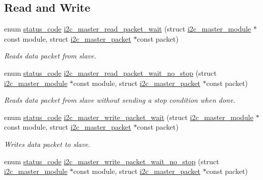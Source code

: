 \subsection*{Read and Write}
\begin{DoxyCompactItemize}
\item 
enum \mbox{\hyperlink{group__group__sam0__utils__status__codes_ga751c892e5a46b8e7d282085a5a5bf151}{status\+\_\+code}} \mbox{\hyperlink{group__asfdoc__sam0__sercom__i2c__group_ga238a755f972b9c3287131cda5fc25725}{i2c\+\_\+master\+\_\+read\+\_\+packet\+\_\+wait}} (struct \mbox{\hyperlink{structi2c__master__module}{i2c\+\_\+master\+\_\+module}} $\ast$const module, struct \mbox{\hyperlink{structi2c__master__packet}{i2c\+\_\+master\+\_\+packet}} $\ast$const packet)
\begin{DoxyCompactList}\small\item\em Reads data packet from slave. \end{DoxyCompactList}\item 
enum \mbox{\hyperlink{group__group__sam0__utils__status__codes_ga751c892e5a46b8e7d282085a5a5bf151}{status\+\_\+code}} \mbox{\hyperlink{group__asfdoc__sam0__sercom__i2c__group_gaa8b27eb9e3a8ae0f907bf7078d4001f0}{i2c\+\_\+master\+\_\+read\+\_\+packet\+\_\+wait\+\_\+no\+\_\+stop}} (struct \mbox{\hyperlink{structi2c__master__module}{i2c\+\_\+master\+\_\+module}} $\ast$const module, struct \mbox{\hyperlink{structi2c__master__packet}{i2c\+\_\+master\+\_\+packet}} $\ast$const packet)
\begin{DoxyCompactList}\small\item\em Reads data packet from slave without sending a stop condition when done. \end{DoxyCompactList}\item 
enum \mbox{\hyperlink{group__group__sam0__utils__status__codes_ga751c892e5a46b8e7d282085a5a5bf151}{status\+\_\+code}} \mbox{\hyperlink{group__asfdoc__sam0__sercom__i2c__group_ga6c07057fe2534e8b4a3ce2cfe2dafc1b}{i2c\+\_\+master\+\_\+write\+\_\+packet\+\_\+wait}} (struct \mbox{\hyperlink{structi2c__master__module}{i2c\+\_\+master\+\_\+module}} $\ast$const module, struct \mbox{\hyperlink{structi2c__master__packet}{i2c\+\_\+master\+\_\+packet}} $\ast$const packet)
\begin{DoxyCompactList}\small\item\em Writes data packet to slave. \end{DoxyCompactList}\item 
enum \mbox{\hyperlink{group__group__sam0__utils__status__codes_ga751c892e5a46b8e7d282085a5a5bf151}{status\+\_\+code}} \mbox{\hyperlink{group__asfdoc__sam0__sercom__i2c__group_ga4d874599c2bff10cd08f5474041c66bb}{i2c\+\_\+master\+\_\+write\+\_\+packet\+\_\+wait\+\_\+no\+\_\+stop}} (struct \mbox{\hyperlink{structi2c__master__module}{i2c\+\_\+master\+\_\+module}} $\ast$const module, struct \mbox{\hyperlink{structi2c__master__packet}{i2c\+\_\+master\+\_\+packet}} $\ast$const packet)

\end{DoxyCompactItemize}
